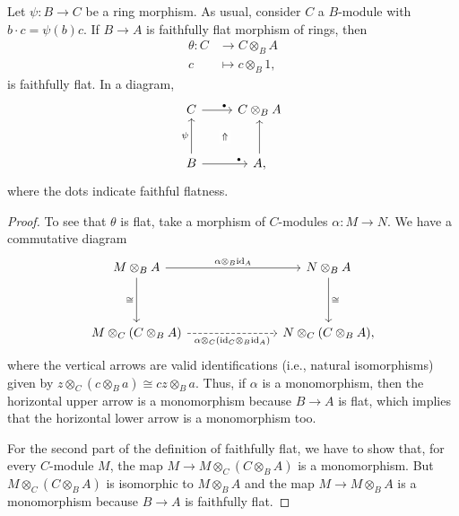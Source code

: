 \newcommand{\ff}{{}_\bullet}
\begin{prop}\label{prop:ff-extension}
    Let\/ $\psi\colon B\to C$ be a ring morphism. As usual, consider\/ $C$ a\/ $B$-module with\/ $b\cdot c=\psi(b)c$. If\/ $B\to A$ is faithfully flat morphism of rings, then
    \begin{align*}
        \theta\colon C&\to C\otimes_B A\\
        c&\mapsto c \otimes_B1,    
    \end{align*}
    is faithfully flat. In a diagram,
    $$
        \begin{tikzcd}[row sep=large]
            C
                    \arrow[r,"\ff", pos=0.75]
                    \arrow[rd,
                        "\Uparrow" description,
                        pos=0.51,
                        draw=none,
                        ]
                &C\otimes_BA\\
            B
                    \arrow[u,"\psi"]
                    \arrow[r,"\ff",
                        pos=0.82]
                &A
                    \arrow[u],
        \end{tikzcd}
    $$
    where the dots indicate faithful flatness.
\end{prop}

\begin{proof}
    To see that $\theta$ is flat, take a morphism of $C$-modules $\alpha\colon M\to N$. We have a commutative diagram
    \small
    $$
        \begin{tikzcd}[column sep=large, row sep=huge]
            M\otimes_BA
                    \arrow[rr,"\alpha\otimes_B\id_A"]
                    \arrow[d,"\cong"']
                &&N\otimes_BA\arrow[d,"\cong"]\\
            M\otimes_C(C\otimes_BA)
                    \arrow[rr,
                        "\alpha\otimes_C(\id_C\otimes_B\id_A)"',
                        dashed]
                &&N\otimes_C(C\otimes_BA),
        \end{tikzcd}
    $$
    where the vertical arrows are valid identifications (i.e., natural isomorphisms) given by $z\otimes_C(c\otimes_Ba)\cong cz\otimes_Ba$. Thus, if $\alpha$ is a monomorphism, then the horizontal upper arrow is a monomorphism because $B\to A$ is flat, which implies that the horizontal lower arrow is a monomorphism too.

    For the second part of the definition of faithfully flat, we have to show that, for every $C$-module $M$, the map $M\to M\otimes_C(C\otimes_BA)$ is a monomorphism. But $M\otimes_C(C\otimes_BA)$ is isomorphic to $M\otimes_BA$ and the map $M\to M\otimes_BA$ is a monomorphism because $B\to A$ is faithfully flat.
\end{proof}

